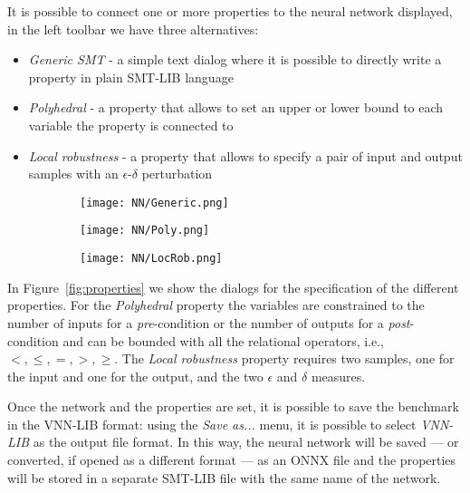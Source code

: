 It is possible to connect one or more properties to the neural network displayed,
in the left toolbar we have three alternatives:
\begin{itemize}
	\item \textit{Generic SMT} - a simple text dialog where it is possible to directly
		write a property in plain SMT-LIB language
	\item \textit{Polyhedral} - a property that allows to set an upper or lower bound
		to each variable the property is connected to
	\item \textit{Local robustness} - a property that allows to specify a pair of
		input and output samples with an $\epsilon$-$\delta$ perturbation
\end{itemize}
%
\begin{figure}[t]
	\centering
	\caption{\label{fig:properties} Screenshot of the edit dialogs for three properties
		available in \coconet. From left to right, as described in the dialog label, 
		there is the \textit{Generic SMT} property, the \textit{Polyhedral} property 
		and the \textit{Local robustness} property.}
	\begin{subfigure}{.3\linewidth}
		\texttt{[image: NN/Generic.png]}
	\end{subfigure}
	\hspace*{\fill}
	\begin{subfigure}{.3\linewidth}
		\texttt{[image: NN/Poly.png]}
	\end{subfigure}
	\hspace*{\fill}
	\begin{subfigure}{.3\linewidth}
		\texttt{[image: NN/LocRob.png]}
	\end{subfigure}
\end{figure}
%
In Figure~\ref{fig:properties} we show the dialogs for the specification of the different
properties. For the \textit{Polyhedral} property the variables are constrained to the
number of inputs for a \textit{pre}-condition or the number of outputs for a 
\textit{post}-condition and can be bounded with all the relational operators, i.e.,
$<, \leq, =, >, \geq$. The \textit{Local robustness} property requires two samples, one
for the input and one for the output, and the two $\epsilon$ and $\delta$ measures.

Once the network and the properties are set, it is possible to save the benchmark in the
VNN-LIB format: using the \textit{Save as...} menu, it is possible to select 
\textit{VNN-LIB} as the output file format. In this way, the neural network will be saved
--- or converted, if opened as a different format --- as an ONNX file and the properties
will be stored in a separate SMT-LIB file with the same name of the network.